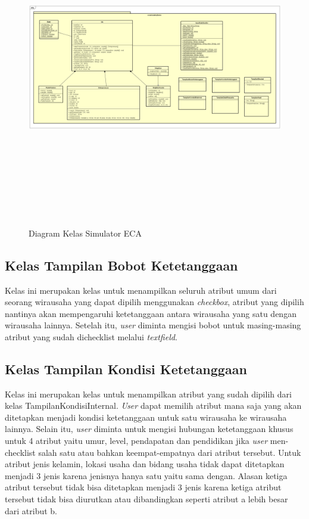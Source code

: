 \begin{figure} [H]
	\centering  
	\includegraphics[width=18cm, height=14cm]{diagramKelas1}
	\caption[Diagram Kelas Simulator ECA]{Diagram Kelas Simulator ECA} 
	\label{fig:classdiagram2} 
\end{figure}






\subsection{Kelas Tampilan Bobot Ketetanggaan}
Kelas ini merupakan kelas untuk menampilkan seluruh atribut umum dari seorang wirausaha yang dapat dipilih menggunakan \textit{checkbox}, atribut yang dipilih nantinya akan mempengaruhi ketetanggaan antara wirausaha yang satu dengan wirausaha lainnya. Setelah itu, \textit{user} diminta mengisi bobot untuk masing-masing atribut yang sudah dichecklist melalui \textit{textfield}.

\subsection{Kelas Tampilan Kondisi Ketetanggaan}
Kelas ini merupakan kelas untuk menampilkan atribut yang sudah dipilih dari kelas TampilanKondisiInternal. \textit{User} dapat memilih atribut mana saja yang akan ditetapkan menjadi kondisi ketetanggaan untuk satu wirausaha ke wirausaha lainnya. Selain itu, \textit{user} diminta untuk mengisi hubungan ketetanggaan khusus untuk 4 atribut yaitu umur, level, pendapatan dan pendidikan jika \textit{user} men-checklist salah satu atau bahkan keempat-empatnya dari atribut tersebut. Untuk atribut jenis kelamin, lokasi usaha dan bidang usaha tidak dapat ditetapkan menjadi 3 jenis karena jenisnya hanya satu yaitu sama dengan. Alasan ketiga atribut tersebut tidak bisa ditetapkan menjadi 3 jenis karena ketiga atribut tersebut tidak bisa diurutkan atau dibandingkan seperti atribut a lebih besar dari atribut b.

